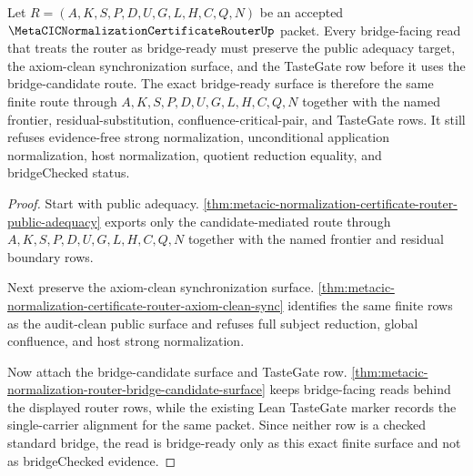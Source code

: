 \begin{theorem}
\label{thm:metacic-router-bridge-ready-exactness}
Let $R=(A,K,S,P,D,U,G,L,H,C,Q,N)$ be an accepted
$\MetaCICNormalizationCertificateRouterUp$ packet. Every bridge-facing read
that treats the router as bridge-ready must preserve the public adequacy target,
the axiom-clean synchronization surface, and the TasteGate row before it uses
the bridge-candidate route. The exact bridge-ready surface is therefore the
same finite route through $A,K,S,P,D,U,G,L,H,C,Q,N$ together with the named
frontier, residual-substitution, confluence-critical-pair, and TasteGate rows.
It still refuses evidence-free strong normalization, unconditional application
normalization, host normalization, quotient reduction equality, and
bridgeChecked status.
\end{theorem}
\begin{proof}
Start with public adequacy. \autoref{thm:metacic-normalization-certificate-router-public-adequacy} exports only the candidate-mediated route through $A,K,S,P,D,U,G,L,H,C,Q,N$ together with the named frontier and residual boundary rows.

Next preserve the axiom-clean synchronization surface. \autoref{thm:metacic-normalization-certificate-router-axiom-clean-sync} identifies the same finite rows as the audit-clean public surface and refuses full subject reduction, global confluence, and host strong normalization.

Now attach the bridge-candidate surface and TasteGate row. \autoref{thm:metacic-normalization-router-bridge-candidate-surface} keeps bridge-facing reads behind the displayed router rows, while the existing Lean TasteGate marker records the single-carrier alignment for the same packet. Since neither row is a checked standard bridge, the read is bridge-ready only as this exact finite surface and not as bridgeChecked evidence.
\end{proof}

